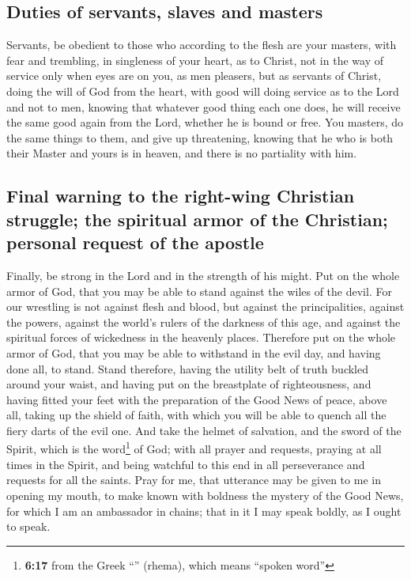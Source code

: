 \hypertarget{duties-of-servants-slaves-and-masters}{%
\subsection{Duties of servants, slaves and
masters}\label{duties-of-servants-slaves-and-masters}}

 Servants, be obedient to those who according to the flesh
are your masters, with fear and trembling, in singleness of your heart,
as to Christ,  not in the way of service only when eyes
are on you, as men pleasers, but as servants of Christ, doing the will
of God from the heart,  with good will doing service as to
the Lord and not to men,  knowing that whatever good thing
each one does, he will receive the same good again from the Lord,
whether he is bound or free.  You masters, do the same
things to them, and give up threatening, knowing that he who is both
their Master and yours is in heaven, and there is no partiality with
him.

\hypertarget{final-warning-to-the-right-wing-christian-struggle-the-spiritual-armor-of-the-christian-personal-request-of-the-apostle}{%
\subsection{Final warning to the right-wing Christian struggle; the
spiritual armor of the Christian; personal request of the
apostle}\label{final-warning-to-the-right-wing-christian-struggle-the-spiritual-armor-of-the-christian-personal-request-of-the-apostle}}

 Finally, be strong in the Lord and in the strength of
his might.  Put on the whole armor of God, that you may
be able to stand against the wiles of the devil.  For our
wrestling is not against flesh and blood, but against the
principalities, against the powers, against the world's rulers of the
darkness of this age, and against the spiritual forces of wickedness in
the heavenly places.  Therefore put on the whole armor of
God, that you may be able to withstand in the evil day, and having done
all, to stand.  Stand therefore, having the utility belt
of truth buckled around your waist, and having put on the breastplate of
righteousness,  and having fitted your feet with the
preparation of the Good News of peace,  above all, taking
up the shield of faith, with which you will be able to quench all the
fiery darts of the evil one.  And take the helmet of
salvation, and the sword of the Spirit, which is the word\footnote{\textbf{6:17}
  from the Greek ``'' (rhema), which means ``spoken word''}
of God;  with all prayer and requests, praying at all
times in the Spirit, and being watchful to this end in all perseverance
and requests for all the saints.  Pray for me, that
utterance may be given to me in opening my mouth, to make known with
boldness the mystery of the Good News,  for which I am an
ambassador in chains; that in it I may speak boldly, as I ought to
speak.

